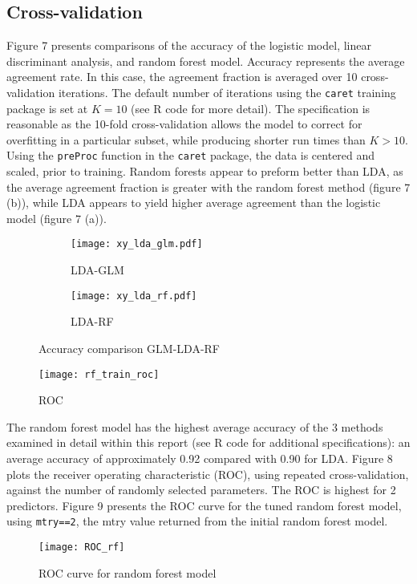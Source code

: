 \documentclass[11pt]{article}
\begin{document}
\subsection{Cross-validation}
Figure 7 presents comparisons of the accuracy of the logistic model, linear discriminant analysis, and random forest model. Accuracy represents the average agreement rate. In this case, the agreement fraction is averaged over 10 cross-validation iterations.  The default number of iterations using the \texttt{caret} training package is set at $K=10$ (see R code for more detail).  The specification is reasonable as the 10-fold cross-validation allows the model to correct for overfitting in a particular subset, while producing shorter run times than $K>10$.  Using the \texttt{preProc} function in the \texttt{caret} package, the data is centered and scaled, prior to training.  Random forests appear to preform better than LDA, as the average agreement fraction is greater with the random forest method (figure 7 (b)), while LDA appears to yield higher average agreement than the logistic model (figure 7 (a)).   
\begin{figure}[!h]
\begin{subfigure}{.5\linewidth}
  \centering
  \texttt{[image: xy\_lda\_glm.pdf]}
  \caption{LDA-GLM}
  \label{fig:sfig1}
\end{subfigure}%
\begin{subfigure}{.5\linewidth}
  \centering
  \texttt{[image: xy\_lda\_rf.pdf]}
  \caption{LDA-RF}
  \label{fig:sfig2}
\end{subfigure}
\caption{Accuracy comparison GLM-LDA-RF}
\label{fig:fig}
\end{figure}

\begin{figure}[!h]
\centering
\texttt{[image: rf\_train\_roc]}
\caption{ROC }
\end{figure}
\indent The random forest model has the highest average accuracy of the 3 methods examined in detail within this report (see R code for additional specifications): an average accuracy of approximately 0.92 compared with 0.90 for LDA.  Figure 8 plots the receiver operating characteristic (ROC), using repeated cross-validation, against the number of randomly selected parameters.  The ROC is highest for 2 predictors.  Figure 9 presents the ROC curve for the tuned random forest model, using \texttt{mtry==2}, the mtry value returned from the initial random forest model.  \\
\begin{figure}[!h]
\centering
\texttt{[image: ROC\_rf]}
\caption{ROC curve for random forest model}
\end{figure}
\end{document}
